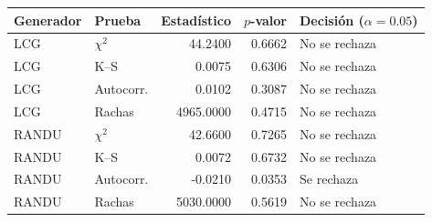 \begin{tabular}{llrrl}
\toprule
Generador & Prueba & Estadístico & $p$-valor & Decisión ($\alpha=0.05$) \\
\midrule
LCG & $\chi^2$ & 44.2400 & 0.6662 & No se rechaza \\
LCG & K--S & 0.0075 & 0.6306 & No se rechaza \\
LCG & Autocorr. & 0.0102 & 0.3087 & No se rechaza \\
LCG & Rachas & 4965.0000 & 0.4715 & No se rechaza \\
RANDU & $\chi^2$ & 42.6600 & 0.7265 & No se rechaza \\
RANDU & K--S & 0.0072 & 0.6732 & No se rechaza \\
RANDU & Autocorr. & -0.0210 & 0.0353 & Se rechaza \\
RANDU & Rachas & 5030.0000 & 0.5619 & No se rechaza \\
\bottomrule
\end{tabular}
